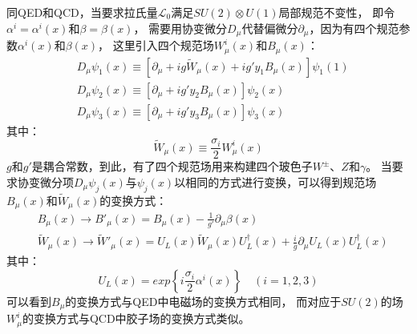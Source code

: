 同QED和QCD，当要求拉氏量$\mathcal{L}_0$满足$SU(2) \otimes U(1)$局部规范不变性，
即令$\alpha^i=\alpha^i(x)$和$\beta=\beta(x)$，
需要用协变微分$D_{\mu}$代替偏微分$\partial_{\mu}$，因为有四个规范参数$\alpha^i(x)$和$\beta(x)$，
这里引入四个规范场$W^i_{\mu}(x)$和$B_{\mu}(x)$：
\begin{equation} 
\label{eq:EW7}
 \begin{split}
  &D_{\mu}\psi_1(x) \equiv \left[ \partial_{\mu}+ig\widetilde{W}_{\mu}(x)+ig'y_1B_{\mu}(x) \right] \psi_1(1)
  \\
 & D_{\mu}\psi_2(x) \equiv \left[ \partial_{\mu}+ig'y_2B_{\mu}(x) \right] \psi_2(x)
  \\
 & D_{\mu}\psi_3(x) \equiv \left[ \partial_{\mu}+ig'y_3B_{\mu}(x) \right] \psi_3(x)
 \end{split}
\end{equation}
其中：
\begin{equation} 
\label{eq:EW8}
\widetilde{W}_{\mu}(x) \equiv \frac{\sigma_i}{2} W^i_{\mu}(x)
\end{equation}
$g$和$g'$是耦合常数，到此，有了四个规范场用来构建四个玻色子$W^{\pm}$、$Z$和$\gamma$。
当要求协变微分项$D_{\mu}\psi_j(x)$与$\psi_j(x)$以相同的方式进行变换，可以得到规范场$B_{\mu}(x)$和$\widetilde{W}_{\mu}(x)$的变换方式：
\begin{equation} 
\label{eq:EW9}
 \begin{split}
 & B_{\mu}(x) \rightarrow B'_{\mu}(x)=  B_{\mu}(x)-  \frac{1}{g'} \partial_{\mu}\beta(x)
  \\
 & \widetilde{W}_{\mu}(x) \rightarrow  \widetilde{W}'_{\mu}(x)=   U_L(x)\widetilde{W}_{\mu}(x) U^{\dagger}_L(x)+\frac{i}{g} \partial_{\mu}U_L(x) U^{\dagger}_L(x)
 \end{split}
\end{equation}
其中：
\begin{equation} 
\label{eq:EW19}
U_L(x)=exp\left\{ i\frac{\sigma_i}{2}\alpha^i(x) \right\} \quad (i=1,2,3)
\end{equation}
可以看到$B_{\mu}$的变换方式与QED中电磁场的变换方式相同，
而对应于$SU(2)$的场$W^i_{\mu}$的变换方式与QCD中胶子场的变换方式类似。

